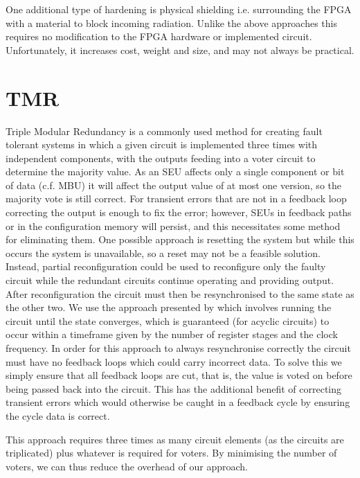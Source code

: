 \documentclass[12pt,final,oneside]{dwThesis} %
\begin{document}
   One additional type of hardening is physical shielding i.e. surrounding the \gls{FPGA} with a material to block incoming radiation. Unlike the above approaches this requires no modification to the \gls{FPGA} hardware or implemented circuit. Unfortunately, it increases cost, weight and size, and may not always be practical. 

   \section{\gls{TMR}}\label{secTMR}
   Triple Modular Redundancy is a commonly used method for creating fault tolerant systems in which a given circuit is implemented three times with independent components, with the outputs feeding into a voter circuit to determine the majority value. As an \gls{SEU} affects only a single component or bit of data (c.f. \gls{MBU}) it will affect the output value of at most one version, so the majority vote is still correct. For transient errors that are not in a feedback loop correcting the output is enough to fix the error; however, \glspl{SEU} in feedback paths or in the configuration memory will persist, and this necessitates some method for eliminating them. One possible approach is resetting the system but while this occurs the system is unavailable, so a reset may not be a feasible solution. Instead, partial reconfiguration could be used to reconfigure only the faulty circuit while the redundant circuits continue operating and providing output. After reconfiguration the circuit must then be resynchronised to the same state as the other two. We use the approach presented by \cite{DiesselChange} which involves running the circuit until the state converges, which is guaranteed (for acyclic circuits) to occur within a timeframe given by the number of register stages and the clock frequency. In order for this approach to always resynchronise correctly the circuit must have no feedback loops which could carry incorrect data. To solve this we simply ensure that all feedback loops are \gls{cut}, that is, the value is voted on before being passed back into the circuit. This has the additional benefit of correcting transient errors which would otherwise be caught in a feedback cycle by ensuring the cycle data is correct.

   This approach requires three times as many circuit elements (as the circuits are triplicated) plus whatever is required for voters. By minimising the number of voters, we can thus reduce the overhead of our approach.
\end{document}
